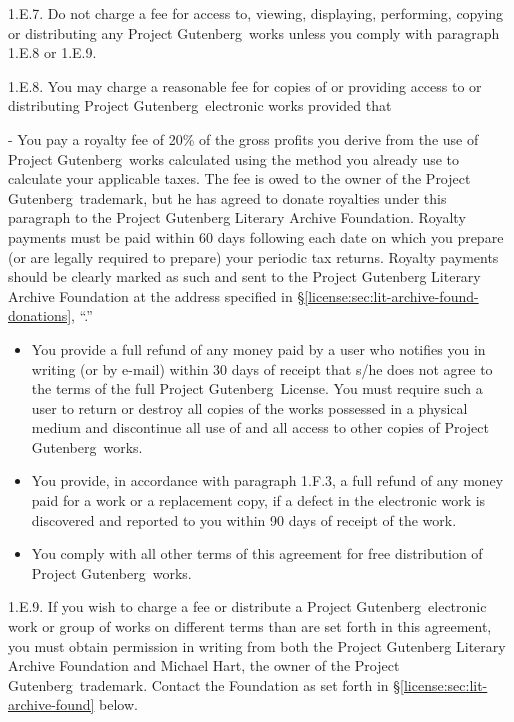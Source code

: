 1.E.7.  Do not charge a fee for access to, viewing, displaying,
performing, copying or distributing any Project
Gutenberg\texttrademark\ works unless you comply with
paragraph 1.E.8 or 1.E.9.

1.E.8.  You may charge a reasonable fee for copies of or providing
access to or distributing Project
Gutenberg\texttrademark\ electronic works provided
that

- You pay a royalty fee of 20\% of the gross profits you derive from
the use of Project Gutenberg\texttrademark\ works calculated using the
method you already use to calculate your applicable taxes.  The fee is
owed to the owner of the Project Gutenberg\texttrademark\ trademark,
but he has agreed to donate royalties under this paragraph to the
Project Gutenberg Literary Archive Foundation.  Royalty payments must
be paid within 60 days following each date on which you prepare (or
are legally required to prepare) your periodic tax returns.  Royalty
payments should be clearly marked as such and sent to the Project
Gutenberg Literary Archive Foundation at the address specified in
\S\ref{license:sec:lit-archive-found-donations},
``.''

\begin{itemize}
\item You provide a full refund of any money paid by a user who
  notifies you in writing (or by e-mail) within 30 days of receipt
  that s/he does not agree to the terms of the full Project
  Gutenberg\texttrademark\ License.  You must require
  such a user to return or destroy all copies of the works possessed
  in a physical medium and discontinue all use of and all access to
  other copies of Project Gutenberg\texttrademark\
  works.

  \item You provide, in accordance with paragraph 1.F.3, a full refund of
  any money paid for a work or a replacement copy, if a defect in the
  electronic work is discovered and reported to you within 90 days of
  receipt of the work.

  \item You comply with all other terms of this agreement for free
  distribution of Project Gutenberg\texttrademark\
  works.
\end{itemize}

1.E.9.  If you wish to charge a fee or distribute a Project
Gutenberg\texttrademark\ electronic work or group of works on
different terms than are set forth in this agreement, you must obtain
permission in writing from both the Project Gutenberg Literary Archive
Foundation and Michael Hart, the owner of the Project
Gutenberg\texttrademark\ trademark.  Contact the Foundation as set
forth in \S\ref{license:sec:lit-archive-found} below.

